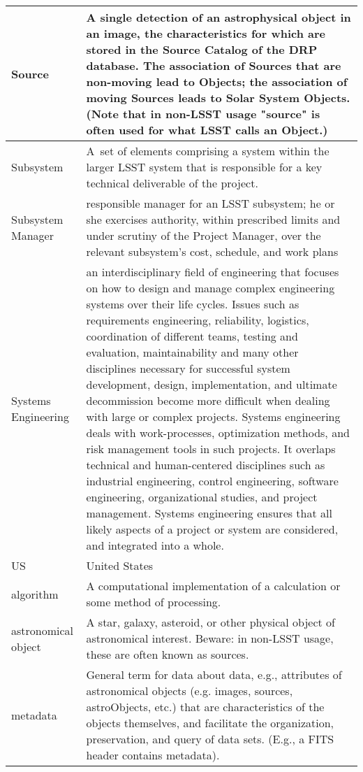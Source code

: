 \begin{longtable}{|l|p{}|}
Source & A single detection of an astrophysical object in an image, the characteristics for which are stored in the \gls{Source} Catalog of the \gls{DRP} database. The association of Sources that are non-moving lead to Objects; the association of moving Sources leads to Solar System Objects. (Note that in non-LSST usage "source" is often used for what \gls{LSST} calls an \gls{Object}.) \\\hline
Subsystem & A set of elements comprising a system within the larger \gls{LSST} system that is responsible for a key technical deliverable of the project. \\\hline
Subsystem Manager & responsible manager for an LSST subsystem; he or she exercises authority, within prescribed limits and under scrutiny of the Project Manager, over the relevant subsystem's cost, schedule, and work plans \\\hline
Systems Engineering & an interdisciplinary field of engineering that focuses on how to design and manage complex engineering systems over their life cycles. Issues such as requirements engineering, reliability, logistics, coordination of different teams, testing and evaluation, maintainability and many other disciplines necessary for successful system development, design, implementation, and ultimate decommission become more difficult when dealing with large or complex projects. Systems engineering deals with work-processes, optimization methods, and risk management tools in such projects. It overlaps technical and human-centered disciplines such as industrial engineering, control engineering, software engineering, organizational studies, and project management. Systems engineering ensures that all likely aspects of a project or system are considered, and integrated into a whole. \\\hline
US & United States \\\hline
algorithm & A computational implementation of a calculation or some method of processing. \\\hline
astronomical object & A star, galaxy, asteroid, or other physical object of astronomical interest. Beware: in non-LSST usage, these are often known as sources. \\\hline
metadata & General term for data about data, e.g., attributes of astronomical objects (e.g. images, sources, astroObjects, etc.) that are characteristics of the objects themselves, and facilitate the organization, preservation, and query of data sets. (E.g., a \gls{FITS} header contains \gls{metadata}). \\\hline

\end{longtable}
